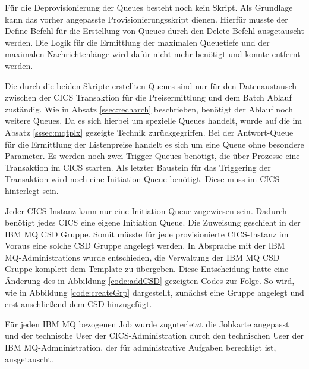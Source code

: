 Für die Deprovisionierung der Queues besteht noch kein Skript.
Als Grundlage kann das vorher angepasste Provisionierungsskript dienen.
Hierfür musste der \glqq Define\grqq-Befehl für die Erstellung von Queues durch den \glqq Delete\grqq-Befehl ausgetauscht werden.
Die Logik für die Ermittlung der maximalen Queuetiefe und der maximalen Nachrichtenlänge wird dafür nicht mehr benötigt und konnte entfernt werden.

Die durch die beiden Skripte erstellten Queues sind nur für den Datenaustausch zwischen der CICS Transaktion für die Preisermittlung und dem Batch Ablauf zuständig.
Wie in Absatz \ref{ssec:recharch} beschrieben, benötigt der Ablauf noch weitere Queues.
Da es sich hierbei um spezielle Queues handelt, wurde auf die im Absatz \ref{sssec:mqtplx} gezeigte Technik zurückgegriffen.
Bei der Antwort-Queue für die Ermittlung der Listenpreise handelt es sich um eine Queue ohne besondere Parameter.
Es werden noch zwei Trigger-Queues benötigt, die über Prozesse eine Transaktion im CICS starten.
Als letzter Baustein für das Triggering der Transaktion wird noch eine Initiation Queue benötigt.
Diese muss im CICS hinterlegt sein.

Jeder CICS-Instanz kann nur eine Initiation Queue zugewiesen sein.
Dadurch benötigt jedes CICS eine eigene Initiation Queue.
Die Zuweisung geschieht in der IBM MQ CSD Gruppe.
Somit müsste für jede provisionierte CICS-Instanz im Voraus eine solche CSD Gruppe angelegt werden.
In Absprache mit der IBM MQ-Administrations  wurde entschieden, die Verwaltung der IBM MQ CSD Gruppe komplett dem Template zu übergeben.
Diese Entscheidung hatte eine Änderung des in Abbildung \ref{code:addCSD} gezeigten Codes zur Folge.
So wird, wie in Abbildung \ref{code:createGrp} dargestellt, zunächst eine Gruppe angelegt und erst anschließend dem CSD hinzugefügt.

\begin{minipage}{\linewidth}

\end{minipage}

Für jeden IBM MQ bezogenen Job wurde zuguterletzt die Jobkarte angepasst und der technische User der CICS-Administration durch den technischen User der IBM MQ-Admninistration, der für administrative Aufgaben berechtigt ist, ausgetauscht.

